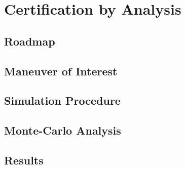 \chapter{Certification by Analysis}

\section{Roadmap}

\section{Maneuver of Interest}

\section{Simulation Procedure}

\section{Monte-Carlo Analysis}

\section{Results}
